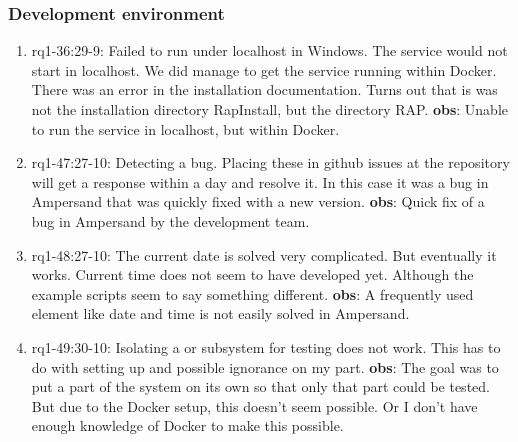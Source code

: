 \subsubsection{Development environment}
\begin{comment}
plaats hier de afgehandelde items.
\end{comment}
\begin{enumerate}
    \item rq1-36:29-9: Failed to run  under localhost in Windows.
    The service would not start in localhost.
    We did manage to get the service running within Docker.
    There was an error in the installation documentation.
    Turns out that is was not the installation directory RapInstall, but the directory RAP.
    \newline\textbf{obs}: Unable to run the service in localhost, but within Docker.
    
    \item rq1-47:27-10: Detecting a bug.
    Placing these in github issues at the  repository will get a response within a day and resolve it.
    In this case it was a bug in Ampersand that was quickly fixed with a new version.
    \newline\textbf{obs}: Quick fix of a bug in Ampersand by the development team.
        
    \item rq1-48:27-10: The  current date is solved very complicated.
    But eventually it works.
    Current time does not seem to have developed yet.
    Although the example scripts seem to say something different.
    \newline\textbf{obs}: A frequently used element like date and time is not easily solved in Ampersand.
    
    \item rq1-49:30-10: Isolating a  or subsystem for testing does not work.
    This has to do with setting up  and possible ignorance on my part.
    \newline\textbf{obs}: The goal was to put a part of the system on its own so that only that part could be tested.
    But due to the Docker setup, this doesn't seem possible.
    Or I don't have enough knowledge of Docker to make this possible.
    
\end{enumerate}

